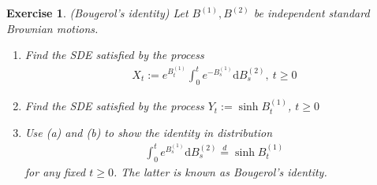 \documentclass[12pt]{article}
\theoremstyle{colon}
\newtheorem{exercise}{Exercise}
\begin{document}
\begin{exercise}
  (Bougerol's identity) Let $B^{(1)}, B^{(2)}$ be independent standard Brownian motions.
  \begin{enumerate}[label=\alph*)]
    \item Find the SDE satisfied by the process
      \begin{gather*}
        X_t := e^{B_t^{(1)}} \int_0^t e^{-B_s^{(1)}} \text{d} B_s^{(2)}, \ t \geq 0
      \end{gather*}

    \item Find the SDE satisfied by the process $Y_t := \sinh B_t^{(1)}$, $t \geq 0$

    \item Use (a) and (b) to show the identity in distribution
      \begin{gather*}
        \int_0^t e^{B_s^{(1)}} \text{d} B_s^{(2)} \stackrel{d}{=} \sinh B_t^{(1)}
      \end{gather*}
      for any fixed $t \geq 0$. The latter is known as \textit{Bougerol's identity}.
  \end{enumerate}
\end{exercise}
\end{document}
